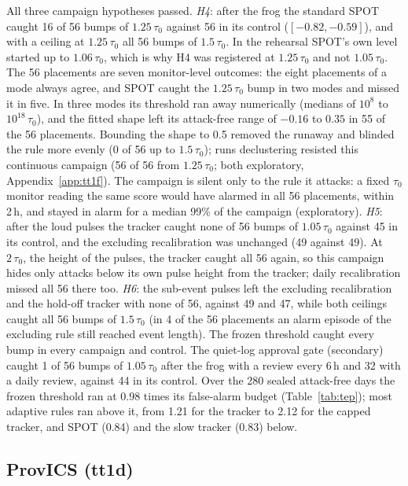 \documentclass[sigconf]{acmart}
\begin{document}
All three campaign hypotheses passed. \emph{H4}: after the frog the standard SPOT caught 16 of 56
bumps of $1.25\,\tau_0$ against 56 in its control ($[-0.82, -0.59]$), and with a ceiling at
$1.25\,\tau_0$ all 56 bumps of $1.5\,\tau_0$. In the rehearsal SPOT's own level started up to
$1.06\,\tau_0$, which is why H4 was registered at $1.25\,\tau_0$ and not $1.05\,\tau_0$. The 56 placements are
seven monitor-level outcomes: the eight placements of a mode always agree, and SPOT caught the
$1.25\,\tau_0$ bump in two modes and missed it in five. In three modes its threshold ran away
numerically (medians of $10^8$ to $10^{18}\,\tau_0$), and the fitted shape left its attack-free range of
$-0.16$ to $0.35$ in 55 of the 56 placements. Bounding the shape to 0.5 removed the runaway and blinded the rule
more evenly (0 of 56 up to $1.5\,\tau_0$); runs declustering resisted this continuous campaign (56 of
56 from $1.25\,\tau_0$; both exploratory, Appendix~\ref{app:tt1f}). The campaign is silent only to the
rule it attacks: a fixed $\tau_0$ monitor reading the same score would have alarmed in all 56
placements, within 2\,h, and stayed in alarm for a median 99\% of the campaign (exploratory). \emph{H5}:
after the loud pulses the tracker caught none of 56 bumps of $1.05\,\tau_0$ against 45 in its control,
and the excluding recalibration was unchanged (49 against 49). At $2\,\tau_0$, the height of the pulses,
the tracker caught all 56 again, so this campaign hides only attacks below its own pulse height from
the tracker; daily recalibration missed all 56 there too. \emph{H6}: the sub-event pulses left
the excluding recalibration and the hold-off tracker with none of 56, against 49 and 47, while both
ceilings caught all 56 bumps of $1.5\,\tau_0$ (in 4 of the 56 placements an alarm episode of the
excluding rule still reached event length). The frozen threshold caught every bump in every campaign
and control. The quiet-log approval gate (secondary) caught 1 of 56 bumps of $1.05\,\tau_0$ after the
frog with a review every 6\,h and 32 with a daily review, against 44 in its control. Over the 280
sealed attack-free days the frozen threshold ran at 0.98 times its false-alarm budget
(Table~\ref{tab:tep}); most adaptive rules ran above it, from 1.21 for the tracker to 2.12 for the
capped tracker, and SPOT (0.84) and the slow tracker (0.83) below.

\subsection{ProvICS (tt1d)}
\label{sec:provics}
\end{document}
